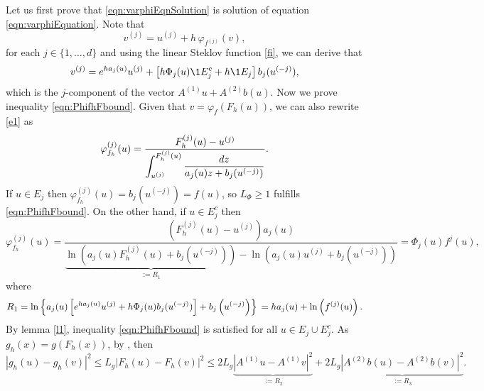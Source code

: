 \begin{pf}
	Let us first prove that \eqref{eqn:varphiEqnSolution} is solution 
	of equation \eqref{eqn:varphiEquation}.  Note that 
	\begin{equation}\label{e1}
		v^{(j)} = u^{(j)} + h \,\varphi_{f^{(j)}}(v),	
	\end{equation}
	for each $j\in \{1,\dots, d\}$ and using the linear Steklov function \eqref{fi}, 
	 we can derive that
	\begin{equation}
		v^{(j)}= e^{h a_j(u)} u^{(j)} + 
		\left[
			h\Phi_j(u)
			\1{E_j^c}
			+h \1{E_j}
		\right]b_{j}(u^{(-j)}),
	\end{equation}	
	 which is the $j$-component of the vector
	$A^{(1)}u +A^{(2)} b(u)$. Now we prove inequality \eqref{eqn:PhifhFbound}. Given that 
	$v =\varphi_{f}(F_h(u))$, 
	we can also rewrite \eqref{e1} as
	$$
		\varphi_{f_h}^{(j)}(u) = 
			\frac{
				F_h^{(j)}(u)-u^{(j)}
			}%
			{%
				\displaystyle
				\int_{u^{(j)}}^{F_h^{(j)}(u)}
				\frac{dz}{a_j(u)z + b_j(u^{(-j)})}
			}.
	$$
	If $u\in E_j$ then $\varphi_{f_h}^{(j)}(u) = b_j(u^{(-j)}) = f(u)$,
	so $L_{\Phi}\geq 1$ fulfills  \eqref{eqn:PhifhFbound}.
	On the other hand, if $u\in E_j^c$ then
	\begin{equation}\label{eqn:VarPhiEjc}
		\varphi_{f_h}^{(j)}(u) =
		\frac{
				(F_h^{(j)}(u)-u^{(j)}) a_j(u)
			}
			{
				\underbrace{
				\ln \left(
					a_j(u) F_h^{(j)}(u) + b_j(u^{(-j)})
				\right)
				}_{:=R_1}
				-
				\ln \left(
					a_j(u) u^{(j)} + b_j(u^{(-j)})
				\right)
			}=\Phi_j(u)f^j(u),		
	\end{equation}
	 where
	\begin{equation}\label{eqn:Ter1Simplification}	
		R_1=
			\ln\left\{
				a_j(u)\left[
					e^{ha_j(u)}u^{(j)} +
					h\Phi_j(u) b_j(u^{(-j)})	
				\right]
				+b_j\left(u^{(-j)}\right)
			\right\} \notag \\
		=h a_j(u) + \ln \left( f^{(j)}(u) \right).		
	\end{equation}
	By lemma \ref{l1}, inequality \eqref{eqn:PhifhFbound} is satisfied 
	for all $u\in E_j \cup E_j^c$. 	As $g_h(x)=g\left(F_h(x) \right)$, 
	by , then
	\begin{equation} \label{eqn:gLocalLipschitzArg} 
		|g_h(u)-g_h(v)|^2 \leq
			L_g|F_h(u)- F_h(v)|^2  \leq
			2L_g \underbrace{
				|A^{(1)}u - A^{(1)}v|^2 
			}_{:=R_2} +
			2L_g \underbrace{
				|A^{(2)}b(u) - A^{(2)}b(v) |^2 
			}_{:=R_3}.			
	\end{equation}

\end{pf}
